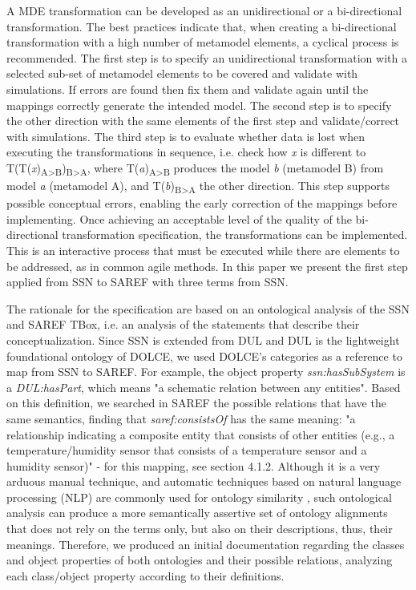 \documentclass{sig-alternate-05-2015}
\begin{document}
A MDE transformation can be developed as an unidirectional or a bi-directional transformation. The best practices indicate that, when creating a bi-directional transformation with a high number of metamodel elements, a cyclical process is recommended. The first step is to specify an unidirectional transformation with a selected sub-set of metamodel elements to be covered and validate with simulations. If errors are found then fix them and validate again until the mappings correctly generate the intended model. The second step is to specify the other direction with the same elements of the first step and validate/correct with simulations. The third step is to evaluate whether data is lost when executing the transformations in sequence, i.e. check how \textit{x} is different to T(T(\textit{x})\textsubscript{A>B})\textsubscript{B>A}, where T(\textit{a})\textsubscript{A>B} produces the model \textit{b} (metamodel B) from model \textit{a} (metamodel A), and T(\textit{b})\textsubscript{B>A} the other direction. This step supports possible conceptual errors, enabling the early correction of the mappings before implementing. Once achieving an acceptable level of the quality of the bi-directional transformation specification, the transformations can be implemented. This is an interactive process that must be executed while there are elements to be addressed, as in common agile methods. In this paper we present the first step applied from SSN to SAREF with three terms from SSN.

The rationale for the specification are based on an ontological analysis of the SSN and SAREF TBox, i.e. an analysis of the statements that describe their conceptualization. Since SSN is extended from DUL and DUL is the lightweight foundational ontology of DOLCE, we used DOLCE's categories as a reference to map from SSN to SAREF. For example, the object property \textit{ssn:\-hasSubSystem} is a \textit{DUL:\-hasPart}, which means "a schematic relation between any entities". Based on this definition, we searched in SAREF the possible relations that have the same semantics, finding that \textit{saref:\-consistsOf} has the same meaning: "a relationship indicating a composite entity that consists of other entities (e.g., a temperature/humidity sensor that consists of a temperature sensor and a humidity sensor)" - for this mapping, see section 4.1.2. Although it is a very arduous manual technique, and automatic techniques based on natural language processing (NLP) are commonly used for ontology similarity \cite{Ganzha2015}, such ontological analysis can produce a more semantically assertive set of ontology alignments that does not rely on the terms only, but also on their descriptions, thus, their meanings. Therefore, we produced an initial documentation regarding the classes and object properties of both ontologies and their possible relations, analyzing each class/object property according to their definitions. 
\end{document}
